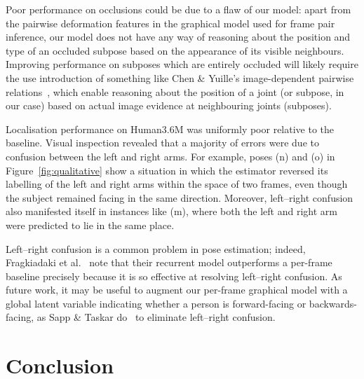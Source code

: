 \documentclass[runningheads]{llncs}
\newif\ifaccvfinal{}
\begin{document}
Poor performance on occlusions could be due to a flaw of our model: apart from
the pairwise deformation features in the graphical model used for frame pair
inference, our model does not have any way of reasoning about the position and
type of an occluded subpose based on the appearance of its visible neighbours.
Improving performance on subposes which are entirely occluded will likely
require the use introduction of something like Chen \& Yuille's image-dependent
pairwise relations~\cite{chen2014articulated}, which enable reasoning about the
position of a joint (or subpose, in our case) based on actual image evidence at
neighbouring joints (subposes).

Localisation performance on Human3.6M was uniformly poor relative to the
baseline. Visual inspection revealed that a majority of errors were due to
confusion between the left and right arms. For example, poses (n) and (o) in
Figure~\ref{fig:qualitative} show a situation in which the estimator reversed
its labelling of the left and right arms within the space of two frames, even
though the subject remained facing in the same direction. Moreover, left--right
confusion also manifested itself in instances like (m), where both the left and
right arm were predicted to lie in the same place.

Left--right confusion is a common problem in pose estimation; indeed,
Fragkiadaki et al.~\cite{fragkiadaki2015recurrent} note that their recurrent
model outperforms a per-frame baseline precisely because it is so effective at
resolving left--right confusion. As future work, it may be useful to augment our
per-frame graphical model with a global latent variable indicating whether a
person is forward-facing or backwards-facing, as Sapp \& Taskar
do~\cite{sapp2013modec} to eliminate left--right confusion.


\section{Conclusion}


\ifaccvfinal
\section*{Acknowledgments}

We would like to thank various authors whose code we have extended or used to
produce baseline
comparisons~\cite{pfister2015flowing,chen2014articulated,cherian2014mixing}.
\fi

\newpage


\end{document}
